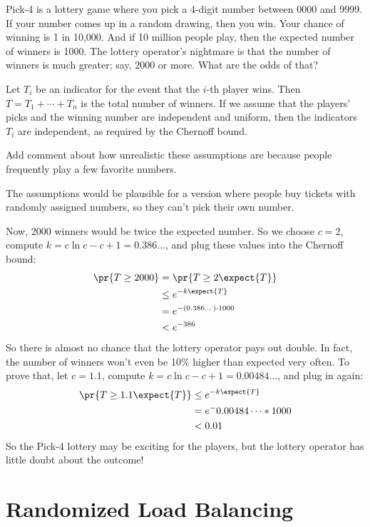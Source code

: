 Pick-4 is a lottery game where you pick a 4-digit number between 0000
and 9999.  If your number comes up in a random drawing, then you win.
Your chance of winning is 1 in 10,000.  And if 10 million people play,
then the expected number of winners is 1000.  The lottery operator's
nightmare is that the number of winners is much greater; say, 2000 or
more.  What are the odds of that?

Let $T_i$ be an indicator for the event that the $i$-th player wins.
Then $T = T_1 + \cdots + T_n$ is the total number of winners.  If we
assume that the players' picks and the winning number are independent
and uniform, then the indicators $T_i$ are independent, as required by
the Chernoff bound.  

\begin{editingnotes}
Add comment about how unrealistic these assumptions are because people
frequently play a few favorite numbers.

The assumptions would be plausible for a version where people buy
tickets with randomly assigned numbers, so they can't pick their own
number.
\end{editingnotes}

Now, 2000 winners would be twice the expected
number.  So we choose $c = 2$, compute $k = c \ln c - c + 1 =
0.386\dots$, and plug these values into the Chernoff bound:
\begin{align*}
\pr{T \geq 2000} & = \pr{T \geq 2 \expect{T}} \\
  & \leq e^{-k \expect{T}} \\
  & = e^{- (0.386\dots) \cdot 1000} \\
  & < e^{-386}
\end{align*}
So there is almost no chance that the lottery operator pays out
double.  In fact, the number of winners won't even be 10\% higher than
expected very often.  To prove that, let $c = 1.1$, compute $k = c \ln
c - c + 1 = 0.00484\dots$, and plug in again:
\begin{align*}
\pr{T \geq 1.1 \expect{T}} & \leq e^{-k \expect{T}} \\
  & = e^- 0.00484\dots * 1000 \\
  & < 0.01
\end{align*}
So the Pick-4 lottery may be exciting for the players, but the lottery
operator has little doubt about the outcome!

\section{Randomized Load Balancing}

